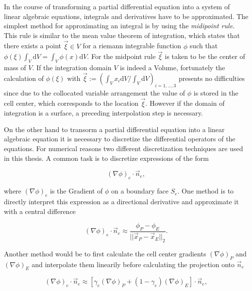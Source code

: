     In the course of transforming a partial differential equation into a system of linear algebraic equations, integrals and derivatives have to be approximated. The simplest method for approximating an integral is by using the \textit{midipoint rule}. This rule is similar to the mean value theorem of integration, which states that there exists a point \(\vec{\xi} \in V\) for a riemann integrable function \(\phi\) such that \(\phi(\xi) \int_V \mathrm{d}V = \int_V \phi(x) \mathrm{d}V\). For the midpoint rule \(\vec{\xi}\) is taken to be the center of mass of \(V\). If the integration domain \(V\) is indeed a Volume, fortunately the calculation of \(\phi(\mathbb{\xi})\) with \(\vec{\xi} := \left({ \int_V x_i \mathrm{d}V }/{ \int_V \mathrm{d}V } \right)_{i = 1,\dots,3}\) presents no difficulties since due to the collocated variable arrangement the value of \(\phi\) is stored in the cell center, which corresponds to the location \(\vec{\xi}\). However if the domain of integration is a surface, a preceding interpolation step is necessary.

    On the other hand to transorm a partial differential equation into a linear algebraic equation it is necessary to discretize the differential operators of the equations. For numerical reasons two different discretization techniques are used in this thesis. A common task is to discretize expressions of the form

    \begin{displaymath}
      \left(\nabla \phi\right)_e \cdot \vec{n}_e,
    \end{displaymath}

    where \(\left(\nabla \phi\right)_e\) is the Gradient of \(\phi\) on a boundary face \(S_e\). One method is to directly interpret this expression as a directional derivative and approximate it with a central difference

    \begin{displaymath}
      \left(\nabla \phi\right)_e \cdot \vec{n}_e \approx \frac{\phi_P - \phi_E}{|| \vec{x}_P - \vec{x}_E ||_2}.
    \end{displaymath}

    Another method would be to first calculate the cell center gradients \(\left(\nabla \phi \right)_P\) and \(\left(\nabla \phi \right)_E\) and interpolate them linearily before calculating the projection onto \(\vec{n}_e\)

    \begin{displaymath}
      \left(\nabla \phi\right)_e \cdot \vec{n}_e 
      \approx 
      \left[\gamma_e \left(\nabla \phi \right)_P + (1-\gamma_e) \left(\nabla \phi \right)_E \right] \cdot \vec{n}_e,
    \end{displaymath}

